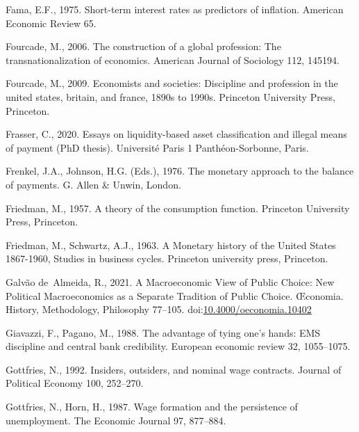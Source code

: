 \documentclass[
  12pt,
  onecolumn]{article}
\newlength{\cslhangindent}
\newlength{\cslentryspacingunit} %
\newenvironment{CSLReferences}[2] %
 {%
  \setlength{\parindent}{0pt}
  \ifodd #1
  \let\oldpar\par
  \def\par{\hangindent=\cslhangindent\oldpar}
  \fi
  \setlength{\parskip}{#2\cslentryspacingunit}
 }%
 {}
\begin{document}
\begin{CSLReferences}{1}{0}
\leavevmode{}%
Fama, E.F., 1975. Short-term interest rates as predictors of inflation.
American Economic Review 65.

\leavevmode{}%
Fourcade, M., 2006. The construction of a global profession: The
transnationalization of economics. American Journal of Sociology 112,
145194.

\leavevmode{}%
Fourcade, M., 2009. Economists and societies: Discipline and profession
in the united states, britain, and france, 1890s to 1990s. Princeton
University Press, Princeton.

\leavevmode{}%
Frasser, C., 2020. Essays on liquidity-based asset classiﬁcation and
illegal means of payment (PhD thesis). Université Paris 1
Panthéon-Sorbonne, Paris.

\leavevmode{}%
Frenkel, J.A., Johnson, H.G. (Eds.), 1976. The monetary approach to the
balance of payments. {G. Allen \& Unwin}, {London}.

\leavevmode{}%
Friedman, M., 1957. A theory of the consumption function. Princeton
University Press, Princeton.

\leavevmode{}%
Friedman, M., Schwartz, A.J., 1963. A {Monetary} history of the {United}
{States} 1867-1960, Studies in business cycles. Princeton university
press, Princeton.

\leavevmode{}%
Galvão de~Almeida, R., 2021. A {Macroeconomic View} of {Public Choice}:
{New Political Macroeconomics} as a {Separate Tradition} of {Public
Choice}. Œconomia. History, Methodology, Philosophy 77--105.
doi:\href{https://doi.org/10.4000/oeconomia.10402}{10.4000/oeconomia.10402}

\leavevmode{}%
Giavazzi, F., Pagano, M., 1988. The advantage of tying one's hands:
{EMS} discipline and central bank credibility. European economic review
32, 1055--1075.

\leavevmode{}%
Gottfries, N., 1992. Insiders, outsiders, and nominal wage contracts.
Journal of Political Economy 100, 252--270.

\leavevmode{}%
Gottfries, N., Horn, H., 1987. Wage formation and the persistence of
unemployment. The Economic Journal 97, 877--884.


\end{CSLReferences}
\end{document}
